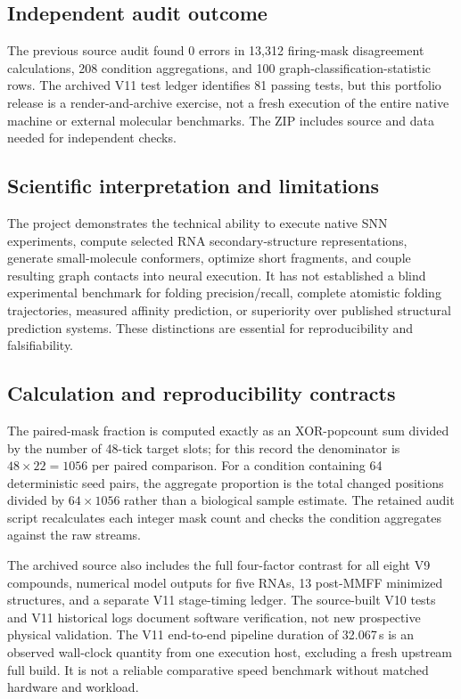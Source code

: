 \documentclass[11pt,a4paper]{article}
\begin{document}
\subsection{Independent audit outcome}
The previous source audit found 0 errors in 13,312 firing-mask disagreement calculations, 208 condition aggregations, and 100 graph-classification-statistic rows. The archived V11 test ledger identifies 81 passing tests, but this portfolio release is a render-and-archive exercise, not a fresh execution of the entire native machine or external molecular benchmarks. The ZIP includes source and data needed for independent checks.
\subsection{Scientific interpretation and limitations}
The project demonstrates the technical ability to execute native SNN experiments, compute selected RNA secondary-structure representations, generate small-molecule conformers, optimize short fragments, and couple resulting graph contacts into neural execution. It has not established a blind experimental benchmark for folding precision/recall, complete atomistic folding trajectories, measured affinity prediction, or superiority over published structural prediction systems. These distinctions are essential for reproducibility and falsifiability.


\subsection{Calculation and reproducibility contracts}
The paired-mask fraction is computed exactly as an XOR-popcount sum divided by the number of 48-tick target slots; for this record the denominator is $48\times22=1056$ per paired comparison. For a condition containing 64 deterministic seed pairs, the aggregate proportion is the total changed positions divided by $64\times1056$ rather than a biological sample estimate. The retained audit script recalculates each integer mask count and checks the condition aggregates against the raw streams.

The archived source also includes the full four-factor contrast for all eight V9 compounds, numerical model outputs for five RNAs, 13 post-MMFF minimized structures, and a separate V11 stage-timing ledger. The source-built V10 tests and V11 historical logs document software verification, not new prospective physical validation. The V11 end-to-end pipeline duration of 32.067\,s is an observed wall-clock quantity from one execution host, excluding a fresh upstream full build. It is not a reliable comparative speed benchmark without matched hardware and workload.
\end{document}
